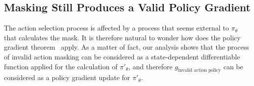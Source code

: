 \documentclass[letterpaper]{article}
\begin{document}

\subsection{Masking Still Produces a Valid Policy Gradient}
The action selection process is affected by a process that seems external to $\pi_\theta$ that calculates the mask. It is therefore natural to wonder how does the policy gradient theorem~\cite{sutton2000policy} apply.
As a matter of fact, our analysis shows that the process of invalid action masking can be considered as a state-dependent differentiable function applied for the calculation of $\pi'_{\theta}$, and therefore $g_{\text{invalid action policy}}$ can be considered as a policy gradient update for $\pi'_{\theta}$.

\end{document}
